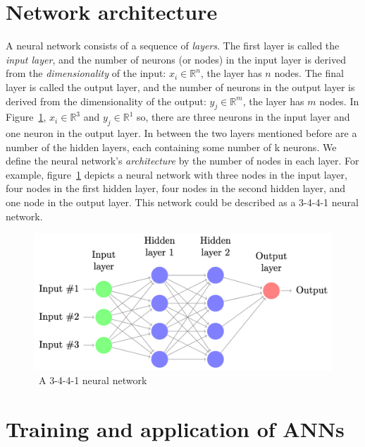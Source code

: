 \section{Network architecture}\label{sec:network-architecture}

A neural network consists of a sequence of \textit{layers}.
The first layer is called the \textit{input layer}, and the number of neurons (or nodes) in the input layer is derived from the \textit{dimensionality} of the input: $x_i \in \mathbb{R}^n$, the layer has $n$ nodes.
The final layer is called the output layer, and the number of neurons in the output layer is derived from the dimensionality of the output: $y_j \in \mathbb{R}^m$, the layer has $m$ nodes.
In Figure~\ref{fig:ann-architecture}, $x_i \in \mathbb{R}^3$ and $y_j \in \mathbb{R}^1$ so, there are three neurons in the input layer and one neuron in the output layer.
In between the two layers mentioned before are a number of the hidden layers, each containing some number of k neurons.
We define the neural network's \textit{architecture} by the number of nodes in each layer.
For example, figure~\ref{fig:ann-architecture} depicts a neural network with three nodes in the input layer, four nodes in the first hidden layer, four nodes in the second hidden layer, and one node in the output layer.
This network could be described as a 3-4-4-1 neural network.~\cite{ann-basics}


\begin{figure}
    \centering
    \includegraphics[width=\textwidth]{assets/ann-architecture}
    \caption{~A 3-4-4-1 neural network~\cite{ann-basics}}\label{fig:ann-architecture}
\end{figure}


\section{Training and application of ANNs}\label{sec:training-and-application-of-anns}

